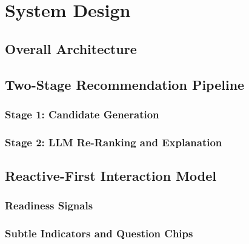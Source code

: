 \chapter{System Design}
\label{chap:design}

\section{Overall Architecture}
\label{sec:design-architecture}


\section{Two-Stage Recommendation Pipeline}
\label{sec:design-pipeline}

\subsection{Stage 1: Candidate Generation}
\label{subsec:design-candidates}


\subsection{Stage 2: LLM Re-Ranking and Explanation}
\label{subsec:design-llm-reranking}


\section{Reactive-First Interaction Model}
\label{sec:design-reactive}

\subsection{Readiness Signals}
\label{subsec:design-readiness}


\subsection{Subtle Indicators and Question Chips}
\label{subsec:design-indicators}


